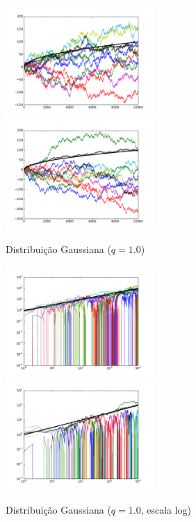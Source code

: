 \documentclass[12pt,a4paper,hidelinks]{article}
\begin{document}
  \pagebreak

  \begin{figure}[htb]
    \caption{Distribuição Gaussiana ($q = 1.0$)}
    \includegraphics[width=0.5\textwidth]{figures/1_0__0.pdf}
    \includegraphics[width=0.5\textwidth]{figures/1_0__1.pdf}
    \label{fig:randomwalk_gaussian}
  \end{figure}

  \begin{figure}[htb]
    \caption{Distribuição Gaussiana ($q = 1.0$, escala log)}
    \includegraphics[width=0.5\textwidth]{figures/1_0__0__log.pdf}
    \includegraphics[width=0.5\textwidth]{figures/1_0__1__log.pdf}
    \label{fig:randomwalk_gaussian_log}
  \end{figure}
\end{document}
